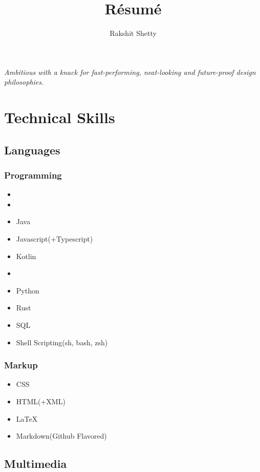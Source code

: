 \documentclass{article}
\makeatletter
\newcommand{\email}{\color{blue}{rakshit24x7@gmail.com}\color{black}}
\renewcommand{\maketitle} {
	\begin{center}
		{\huge\bfseries\theauthor} \linebreak[4]
		\vspace{.25em}
		\email \linebreak[4]
		\textsl{Ambitious with a knack for fast-performing, neat-looking and future-proof design philosophies.}
	\end{center}
}
\newcommand{\unimportant}[1]{
	\color{gray}{#1}\color{black}
}
\makeatother
\begin{document}
	\title{R\'esum\'e}
	\author{Rakshit Shetty}

	\maketitle

	\section{Technical Skills}
		\subsection{Languages}
			\subsubsection{Programming}
				\begin{itemize}
					\item \unimportant{C \& C++}
					\item \unimportant{Haskell}
					\item Java
					\item Javascript(+Typescript)
					\item Kotlin
					\item \unimportant{Lisp}
					\item Python
					\item Rust
					\item SQL
					\item Shell Scripting(sh, bash, zsh)
				\end{itemize}
			\subsubsection{Markup}
				\begin{itemize}
					\item CSS
					\item HTML(+XML)
					\item {\LaTeX}
					\item Markdown(Github Flavored)
				\end{itemize}
		\subsection{Multimedia}
\end{document}
